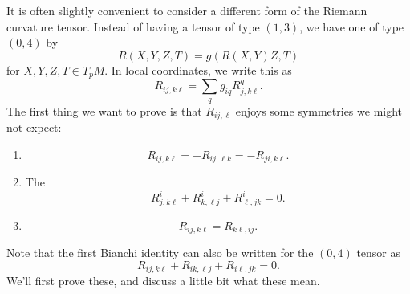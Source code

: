\documentclass[a4paper]{article}
\begin{document}
It is often slightly convenient to consider a different form of the Riemann curvature tensor. Instead of having a tensor of type $(1, 3)$, we have one of type $(0, 4)$ by
\[
  R(X, Y, Z, T) = g(R(X, Y)Z, T)
\]
for $X, Y, Z, T \in T_p M$. In local coordinates, we write this as
\[
  R_{ij, k\ell} = \sum_q g_{iq} R^q_{j, k\ell}.
\]
The first thing we want to prove is that $R_{ij, \ell}$ enjoys some symmetries we might not expect:
\begin{prop}\leavevmode
  \begin{enumerate}
    \item
      \[
        R_{ij, k\ell} = - R_{ij, \ell k} = - R_{ji, k\ell}.
      \]
    \item The 
      \[
        R^i_{j, k \ell} + R^i_{k, \ell j} + R^i_{\ell, jk} = 0.
      \]
    \item
      \[
        R_{ij, k\ell} = R_{k\ell, ij}.
      \]
  \end{enumerate}
\end{prop}
Note that the first Bianchi identity can also be written for the $(0, 4)$ tensor as
\[
  R_{ij, k\ell} + R_{ik, \ell j} + R_{i\ell, jk} = 0.
\]
We'll first prove these, and discuss a little bit what these mean.
\end{document}
